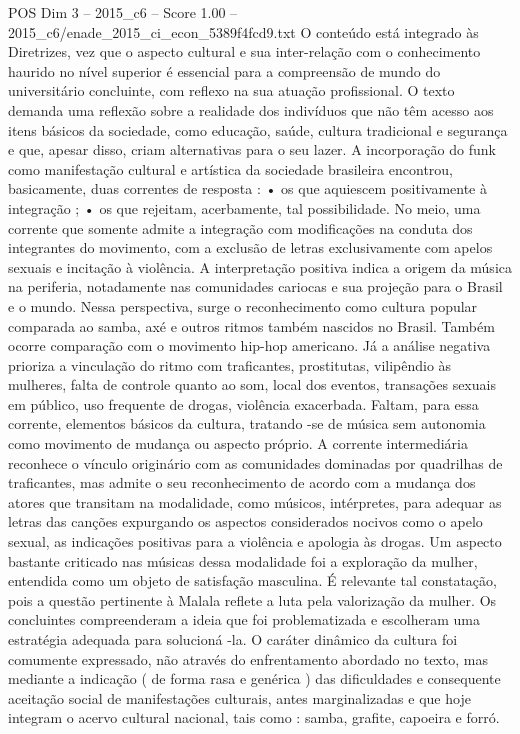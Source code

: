 \begin{textsample}{POS Dim 3 – 2015\_c6 – Score 1.00 – 2015\_c6/enade\_2015\_ci\_econ\_5389f4fcd9.txt}
O conteúdo está integrado às Diretrizes, vez que o aspecto cultural e sua inter-relação com o conhecimento haurido no nível superior é essencial para a compreensão de mundo do universitário concluinte, com reflexo na sua atuação profissional.
O texto demanda uma reflexão sobre a realidade dos indivíduos que não têm acesso aos itens básicos da sociedade, como educação, saúde, cultura tradicional e segurança e que, apesar disso, criam alternativas para o seu lazer.
A incorporação do funk como manifestação cultural e artística da sociedade brasileira encontrou, basicamente, duas correntes de resposta : • os que aquiescem positivamente à integração ; • os que rejeitam, acerbamente, tal possibilidade.
No meio, uma corrente que somente admite a integração com modificações na conduta dos integrantes do movimento, com a exclusão de letras exclusivamente com apelos sexuais e incitação à violência.
A interpretação positiva indica a origem da música na periferia, notadamente nas comunidades cariocas e sua projeção para o Brasil e o mundo.
Nessa perspectiva, surge o reconhecimento como cultura popular comparada ao samba, axé e outros ritmos também nascidos no Brasil.
Também ocorre comparação com o movimento hip-hop americano.
Já a análise negativa prioriza a vinculação do ritmo com traficantes, prostitutas, vilipêndio às mulheres, falta de controle quanto ao som, local dos eventos, transações sexuais em público, uso frequente de drogas, violência exacerbada.
Faltam, para essa corrente, elementos básicos da cultura, tratando -se de música sem autonomia como movimento de mudança ou aspecto próprio.
A corrente intermediária reconhece o vínculo originário com as comunidades dominadas por quadrilhas de traficantes, mas admite o seu reconhecimento de acordo com a mudança dos atores que transitam na modalidade, como músicos, intérpretes, para adequar as letras das canções expurgando os aspectos considerados nocivos como o apelo sexual, as indicações positivas para a violência e apologia às drogas.
Um aspecto bastante criticado nas músicas dessa modalidade foi a exploração da mulher, entendida como um objeto de satisfação masculina.
É relevante tal constatação, pois a questão pertinente à Malala reflete a luta pela valorização da mulher.
Os concluintes compreenderam a ideia que foi problematizada e escolheram uma estratégia adequada para solucioná -la.
O caráter dinâmico da cultura foi comumente expressado, não através do enfrentamento abordado no texto, mas mediante a indicação ( de forma rasa e genérica ) das dificuldades e consequente aceitação social de manifestações culturais, antes marginalizadas e que hoje integram o acervo cultural nacional, tais como : samba, grafite, capoeira e forró.

\end{textsample}
